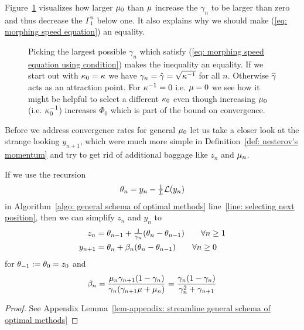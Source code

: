 %
Figure~\ref{fig: gamma path}
visualizes how larger \(\mu_0\) than \(\mu\) increase the \(\gamma_n\)
to be larger than zero and thus decrease the \(\Gamma_1^n\) below one. It also
explains why we should make (\ref{eq: morphing speed equation}) an equality.
%
\begin{figure}[h]
	\centering
	\def\svgwidth{1\textwidth}
	
	\caption{
		Picking the largest possible \(\gamma_n\) which satisfy (\ref{eq:
		morphing speed equation using condition}) makes the inequality an
		equality. If we start out with \(\kappa_0=\kappa\) we have
		\(\gamma_n=\hat{\gamma}=\sqrt{\kappa^{-1}}\) for all \(n\).
		Otherwise \(\hat{\gamma}\) acts as an attraction point.
		For \(\kappa^{-1}=0\) i.e. \(\mu=0\)
		we see how it might be helpful to select a different \(\kappa_0\)
		even though increasing \(\mu_0\) (i.e. \(\kappa_0^{-1}\))
		increases \(\Phi_0\) which is part of the bound on convergence.
	}
	\label{fig: gamma path}
\end{figure}

Before we address convergence rates for general \(\mu_0\) let us take a
closer look at the strange looking \(y_{n+1}\), which were much more simple in
Definition~\ref{def: nesterov's momentum} and try to get rid of 
additional baggage like \(z_n\) and \(\mu_n\).

\begin{lemma}\label{lem: streamline general schema of optimal methods}
	If we use the recursion
	\begin{align}\label{eq-lem-assmpt: weigth recursion}
		\theta_n = y_n - \tfrac1{L}\mathcal{L}(y_n)
	\end{align}
	in Algorithm~\ref{algo: general schema of optimal methods} line~\ref{line:
	selecting next position}, then we can simplify \(z_n\) and \(y_n\)
	to
	\begin{align}
		z_n
		&= \theta_{n-1} + \tfrac1{\gamma_n}(\theta_n-\theta_{n-1})
		\qquad \forall n\ge 1\\
		y_{n+1}
		&=\theta_n + \beta_n(\theta_n-\theta_{n-1}) \qquad \forall n\ge 0
	\end{align}
	for \(\theta_{-1}:=\theta_0=z_0\) and
	\begin{align}
		\beta_n
		= \frac{\mu_n \gamma_{n+1}(1-\gamma_n)}{\gamma_n(\gamma_{n+1}\mu +\mu_n)}
		= \frac{\gamma_n(1-\gamma_n)}{\gamma_n^2 + \gamma_{n+1}}
	\end{align}
\end{lemma}
\begin{proof}
	See Appendix Lemma~\ref{lem-appendix: streamline general schema of optimal methods}
\end{proof}

